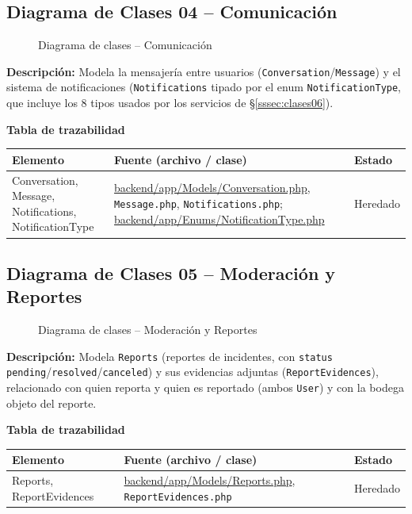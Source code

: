 \subsection{Diagrama de Clases 04 -- Comunicación}
\label{sssec:clases04}
\begin{figure}[H]
    \centering
    \caption{Diagrama de clases -- Comunicación}
    \label{fig:clases04}
\end{figure}
\noindent\textbf{Descripción:} Modela la mensajería entre usuarios (\texttt{Conversation}/\texttt{Message}) y el sistema de notificaciones (\texttt{Notifications} tipado por el enum \texttt{NotificationType}, que incluye los 8 tipos usados por los servicios de \S\ref{sssec:clases06}).

\bigskip
\noindent\textbf{Tabla de trazabilidad}
\begin{longtable}{|L{5.5cm}|L{7.5cm}|M{2cm}|}
\hline
{} \textbf{Elemento} & \textbf{Fuente (archivo / clase)} & \textbf{Estado} \\ \hline
\endhead
Conversation, Message, Notifications, NotificationType & \url{backend/app/Models/Conversation.php}, \texttt{Message.php}, \texttt{Notifications.php}; \url{backend/app/Enums/NotificationType.php} & Heredado \\ \hline
\end{longtable}
\clearpage

\subsection{Diagrama de Clases 05 -- Moderación y Reportes}
\label{sssec:clases05}
\begin{figure}[H]
    \centering
    \caption{Diagrama de clases -- Moderación y Reportes}
    \label{fig:clases05}
\end{figure}
\noindent\textbf{Descripción:} Modela \texttt{Reports} (reportes de incidentes, con \texttt{status} \texttt{pending}/\texttt{resolved}/\texttt{canceled}) y sus evidencias adjuntas (\texttt{ReportEvidences}), relacionado con quien reporta y quien es reportado (ambos \texttt{User}) y con la bodega objeto del reporte.

\bigskip
\noindent\textbf{Tabla de trazabilidad}
\begin{longtable}{|L{5.5cm}|L{7.5cm}|M{2cm}|}
\hline
{} \textbf{Elemento} & \textbf{Fuente (archivo / clase)} & \textbf{Estado} \\ \hline
\endhead
Reports, ReportEvidences & \url{backend/app/Models/Reports.php}, \texttt{ReportEvidences.php} & Heredado \\ \hline
\end{longtable}
\clearpage

